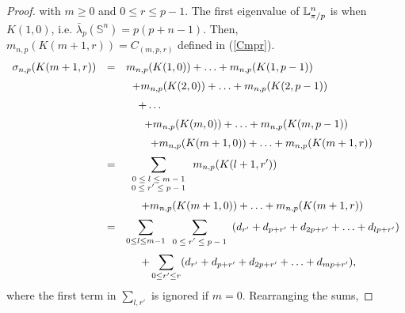 \documentclass[11pt,a4paper,times]{amsart}
\theoremstyle{plain}
\theoremstyle{definition}
\numberwithin{equation}{section}
\newcommand{\ds}{\displaystyle}
\newcommand{\dsum}{\ds\sum}
\newcommand{\eqskip}{ \vspace*{2mm}\\ }
\newcommand{\luned}[2]{\raisebox{0.5pt}{${}$}\mathbb{L}^{#1}_{\pi/#2}}
\begin{document}
{\begin{proof}
with $m\geq 0$ and $0\leq r\leq p-1$. 
The first eigenvalue of $\luned{n}{p}$ is when
$K(1,0)$, i.e. 
$\bar{\lambda}_p(\mathbb{S}^n)=p(p+n-1)$. 
Then, $m_{n,p}(K(m+1,r))= C_{(m,p,r)}$
defined in (\ref{Cmpr}).
\[
\begin{array}{lll}
\sigma_{n,p}(K(m+1,r)) & = & m_{n,p}(K(1,0))+ \ldots + m_{n,p}(K(1,p-1))\eqskip
&& \hspace*{2mm} +m_{n,p}(K(2,0))+\ldots+ m_{n,p}(K(2,p-1))\eqskip
&& \hspace*{4mm}+\ldots\eqskip
&& \hspace*{6mm} + m_{n,p}(K(m,0))+ \ldots +m_{n,p}(K(m,p-1))\eqskip
&& \hspace*{8mm}  + m_{n,p}(K(m+1,0))+\ldots + m_{n,p}(K(m+1,r))
\eqskip
& = &  \dsum_{\scriptsize \begin{array}{c}
0\leq l\leq m-1\\ 0\leq r'\leq p-1\end{array}} m_{n,p}(K(l+1,r'))\eqskip
& & \hspace*{5mm}  + m_{n,p}(K(m+1,0))+\ldots + m_{n,p}(K(m+1,r))\eqskip
& = &\dsum_{ 0\leq l\leq m-1}\dsum_{\scriptsize \begin{array}{c}  0\leq r'\leq p-1\end{array}}
(d_{r'}+ d_{p+r'}+ d_{2p+r'}+\ldots+d_{lp+r'})\eqskip
&&
\hspace*{5mm} + \dsum_{0\leq r'\leq r} (d_{r'}+ d_{p+r'}+ d_{2p+r'}+\ldots+d_{mp+r'}),
\end{array}
\]
where the first term in $\sum_{l,r'}$ is ignored if $m=0$. Rearranging the sums,


\end{proof}}
\end{document}
